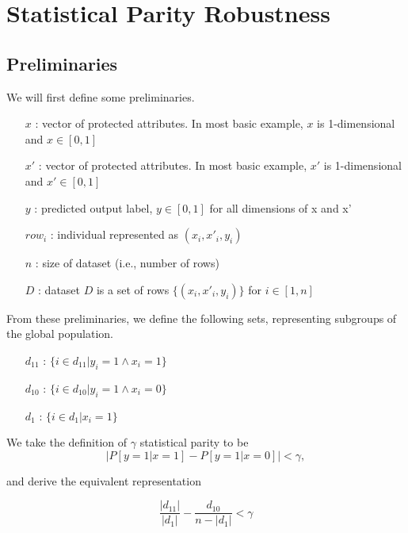 
\section{Statistical Parity Robustness}

\subsection{Preliminaries}
We will first define some preliminaries.
\begin{itemize}[label={}, itemsep=-1em]
\item[$x$]: vector of protected attributes. In most basic example, $x$ is 1-dimensional and $x \in [0, 1]$\\
\item[$x'$]: vector of protected attributes. In most basic example, $x'$ is 1-dimensional and $x' \in [0, 1]$\\
\item[$y$]: predicted output label, $y \in [0, 1]$ for all dimensions of x and x'\\
\item[$row_i$]: individual represented as $(x_i, x'_i, y_i)$\\
\item[$n$]: size of dataset (i.e., number of rows)\\
\item[$D$]: dataset $D$ is a set of rows $\{ (x_i, x'_i, y_i) \}$ for $i \in [1, n]$\\
\end{itemize}

From these preliminaries, we define the following sets, representing subgroups of the global population.
\begin{itemize}[label={}, itemsep=-1em]
\item[$d_{11}$]: $\{ i \in d_{11} | y_i = 1 \land x_i = 1 \}$\\
\item[$d_{10}$]: $\{ i \in d_{10} | y_i = 1 \land x_i = 0 \}$\\
\item[$d_{1}$]: $\{ i \in d_{1} | x_i = 1 \}$\\
\end{itemize}

We take the definition of $\gamma$ statistical parity to be
\[
\left| P[ y = 1 | x = 1] - P[ y = 1 | x = 0] \right| < \gamma,
\]

and derive the equivalent representation 

\[
\frac{\left| d_{11} \right|}{\left| d_1 \right|} - \frac{d_{10}}{n - \left| d_1 \right|} < \gamma
\]